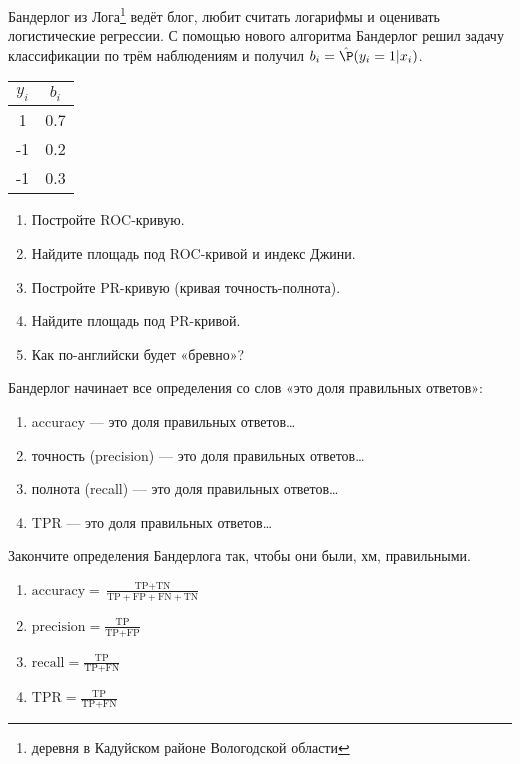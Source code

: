 \documentclass[pdftex, 12pt, a4paper]{article}
\begin{document}

\begin{problem}
	Бандерлог из Лога\footnote{деревня в Кадуйском районе Вологодской области} ведёт блог, любит считать логарифмы и оценивать логистические регрессии. С помощью нового алгоритма Бандерлог решил задачу классификации по трём наблюдениям и получил $b_i = \hat\P(y_i = 1|x_i)$.
	
	\begin{tabular}{cc}
		\toprule
		$y_i$ & $b_i$ \\
		\midrule
		1 & 0.7 \\
		-1 & 0.2 \\
		-1 & 0.3 \\
		\bottomrule
	\end{tabular}
	
	\begin{enumerate}
		\item Постройте ROC-кривую.
		\item Найдите площадь под ROC-кривой и индекс Джини.
		\item Постройте PR-кривую (кривая точность-полнота).
		\item Найдите площадь под PR-кривой.
		\item Как по-английски будет «бревно»?
	\end{enumerate}
	\begin{sol}
	\end{sol}
\end{problem}


\begin{problem}
	Бандерлог начинает все определения со слов «это доля правильных ответов»:
	\begin{enumerate}
		\item accuracy — это доля правильных ответов\ldots
		\item точность (precision) — это доля правильных ответов\ldots
		\item полнота (recall) — это доля правильных ответов\ldots
		\item TPR — это доля правильных ответов\ldots
	\end{enumerate}
	
	Закончите определения Бандерлога так, чтобы они были, хм, правильными.
	\begin{sol}
		\begin{enumerate}
			\item $\text{accuracy} = \frac{\text{TP} + \text{TN}}{\text{TP} +\text{FP} +\text{FN} +\text{TN}}$
			\item $\text{precision} = \frac{\text{TP}}{\text{TP} +\text{FP}}$
			\item $\text{recall} = \frac{\text{TP}}{\text{TP} +\text{FN}}$
			\item $\text{TPR} = \frac{\text{TP}}{\text{TP} +\text{FN}}$
		\end{enumerate}
	\end{sol}
\end{problem}
\end{document}
